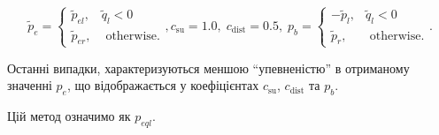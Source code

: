 \documentclass[14pt,handout,utf8]{beamer}
\begin{document}
\begin{frame}
  \vspace{-7ex}

  \begin{equation}
    \tilde{p}_e
    =
    \begin{cases}
      \tilde{p}_{el}, & \tilde{q}_l < 0
      \\
      \tilde{p}_{er}, & \text{ otherwise}.
    \end{cases}
    ,
    c_\mathrm{su} = 1.0, \;  c_\mathrm{dist} = 0.5,  \;
    p_b =
    \begin{cases}
      -\tilde{p}_l, & \tilde{q}_l < 0
      \\
      \tilde{p}_r, & \text{ otherwise}.
    \end{cases}.
    \label{atu:eq:pr_e4}
  \end{equation}

  Останні випадки,
  характеризуються меншою ``упевненістю'' в отриманому значенні $p_e$,
  що відображається у коефіцієнтах
  $c_\mathrm{su}$, $c_\mathrm{dist}$ та  $p_b$.

  Цій метод означимо як $p_{eql}$.

\end{frame}



\end{document}
